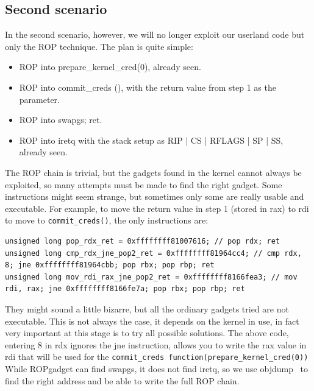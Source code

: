 \documentclass{masterthesis}
\begin{document}
\subsection{Second scenario}
\label{subsect:second scenario}
In the second scenario, however, we will no longer exploit our userland code but only the ROP technique.
The plan is quite simple:
\begin{itemize}
\item ROP into prepare\_kernel\_cred(0), already seen.
\item ROP into commit\_creds (), with the return value from step 1 as the parameter.
\item ROP into swapgs; ret.
\item ROP into iretq with the stack setup as RIP | CS | RFLAGS | SP | SS, already seen.
\end{itemize}
The ROP chain is trivial, but the gadgets found in the kernel cannot always be exploited, so many attempts must be made to find the right gadget.
Some instructions might seem strange, but sometimes only some are really usable and executable.
For example, to move the return value in step 1 (stored in rax) to rdi to move to \texttt{commit\_creds()}, the only instructions are:
\begin{lstlisting}
unsigned long pop_rdx_ret = 0xffffffff81007616; // pop rdx; ret
unsigned long cmp_rdx_jne_pop2_ret = 0xffffffff81964cc4; // cmp rdx, 8; jne 0xffffffff81964cbb; pop rbx; pop rbp; ret
unsigned long mov_rdi_rax_jne_pop2_ret = 0xffffffff8166fea3; // mov rdi, rax; jne 0xffffffff8166fe7a; pop rbx; pop rbp; ret
\end{lstlisting}
They might sound a little bizarre, but all the ordinary gadgets tried are not executable.
This is not always the case, it depends on the kernel in use, in fact very important at this stage is to try all possible solutions.
The above code, entering 8 in rdx ignores the jne instruction, allows you to write the rax value in rdi that will be used for the \texttt{commit\_creds function(prepare\_kernel\_cred(0))}
While ROPgadget can find swapgs, it does not find iretq, so we use objdump~\cite{weatherspoonassemblers} to find the right address and be able to write the full ROP chain.
\end{document}
